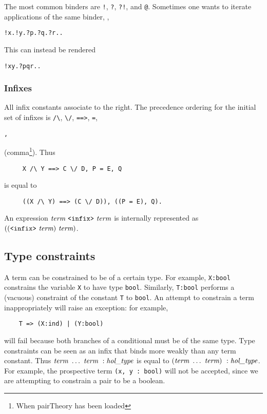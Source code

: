 The most common binders are \verb+!+, \verb+?+, \verb+?!+, and
 \verb+@+. Sometimes one wants to iterate applications of the same binder,
 \eg, 
 \begin{alltt}
    !x. !y. ?p. ?q. ?r. \term.
 \end{alltt}
 This can instead be rendered
 \begin{alltt}
     !x y. ?p q r. \term.
 \end{alltt}

 \subsubsection{Infixes}

All infix constants associate to the right. The precedence ordering for the
initial set of infixes is 
 \verb+/\+, \verb+\/+, \verb+==>+, \verb+=+, \begin{Large}\verb+,+\end{Large}
 (comma\footnote{When pairTheory has been loaded}). Thus 
 \begin{verbatim}
     X /\ Y ==> C \/ D, P = E, Q
 \end{verbatim}
 is equal to 
 \begin{verbatim}
     ((X /\ Y) ==> (C \/ D)), ((P = E), Q).
 \end{verbatim}

\noindent An expression $\term\ \verb+<infix>+\ \term$ is internally
represented as $((\verb+<infix>+\ \term)\ \term)$.

\subsection{Type constraints}

 A term can be constrained to be of a certain type.  For example,
 \verb+X:bool+ constrains the variable \verb+X+ to have type
 \verb+bool+. Similarly, \verb+T:bool+ performs a (vacuous) constraint of
 the constant \verb+T+ to \verb+bool+. An attempt to constrain a term
 inappropriately will raise an exception: for example,
 \begin{verbatim}
    T => (X:ind) | (Y:bool)
 \end{verbatim}
 will fail because both branches of a conditional must be of the same type.
 Type constraints can be seen as an infix that binds more weakly than any
 term constant. Thus $\term\ \ldots\ \term \ : \type$ is equal to
 $(\term\ \ldots\ \term)\ : \type$. For example, the prospective term
 \verb+(x, y : bool)+ will not be accepted, since we are attempting to
 constrain a pair to be a boolean. 

